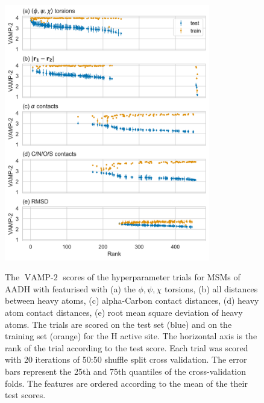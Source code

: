 \begin{figure}
    \centering
    \caption{The $\operatorname{VAMP-2}$ scores of the hyperparameter trials for MSMs of AADH with featurised with (a) the $\phi, \psi, \chi$ torsions, (b) all distances between heavy atoms, (c) alpha-Carbon contact distances, (d) heavy atom contact distances, (e) root mean square deviation of heavy atoms. The trials are scored on the test set (blue) and on the training set (orange) for the H active site. The horizontal axis is the rank of the trial according to the test score. Each trial was scored with 20 iterations of 50:50 shuffle split cross validation. The error bars represent the 25th and 75th quantiles of the cross-validation folds. The features are ordered according to the mean of the their test scores.}
    \includegraphics[width=0.8\textwidth]{chapters/msm_optimization/figures/aadh_train_test_results.png}
    \label{fig:aad_train_test}
\end{figure}



